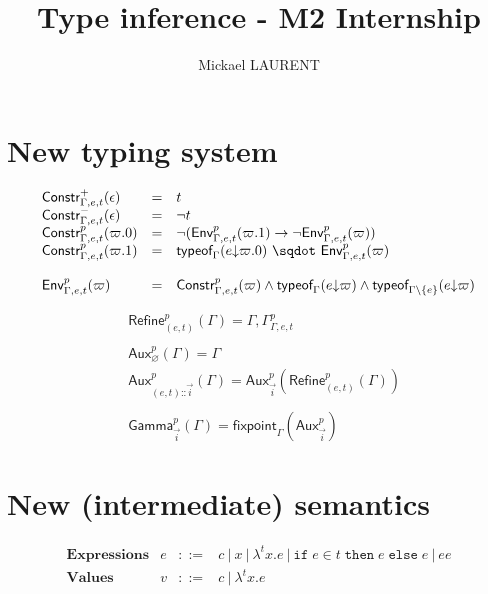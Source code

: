 \documentclass[a4paper]{article}%
\title{\vspace{1.5cm}Type inference - M2 Internship}
\author{Mickael LAURENT}
\date{\vspace{-5ex}}
\newcommand{\worra}[2]{#1\mathop{\,\sqdot\,} #2}
\newcommand{\alt}{~|~}
\newcommand{\ite}[4]{\ensuremath{\texttt{if}\;#1\in#2\;\texttt{then}\;#3\;\texttt{else}\;#4}}
\newcommand{\tyof}[2]{\textsf{typeof}_{#2}(#1)}
\newcommand{\typep}[3]{\textsf{Constr}^{#1}_{#3}(#2)}
\newcommand{\Gp}[2]{\textsf{Env}^{#1}_{#2}}
\newcommand{\arrow}[2]{#1\to #2}
\newcommand{\occ}[2]{#1{\downarrow}#2}
\newcommand{\Genv}[3]{\textsf{Gamma}^{#1}_{#2}(#3)}
\newcommand{\Gaux}[3]{\textsf{Aux}^{#1}_{#2}(#3)}
\newcommand{\Gaa}[2]{\textsf{Aux}^{#1}_{#2}}
\newcommand{\Refine}[3]{\textsf{Refine}^{#1}_{#2}(#3)}
\newcommand{\cons}[2]{{#1}\textsf{::}{#2}}
\newcommand{\fixpoint}{\textsf{fixpoint}}
\theoremstyle{definition}
\begin{document}
	\maketitle

    \section{New typing system}

    \[
    \begin{array}{lcl}
      \typep+\epsilon{\Gamma,e,t} & = & t\\
      \typep-\epsilon{\Gamma,e,t} & = & \neg t\\
      \typep{p}{\varpi.0}{\Gamma,e,t} & = & \neg(\arrow{\Gp p{\Gamma,e,t}{(\varpi.1)}}{\neg \Gp p {\Gamma,e,t} (\varpi)})\\
      \typep{p}{\varpi.1}{\Gamma,e,t} & = & \worra{\tyof{\occ e{\varpi.0}}\Gamma}{\Gp p {\Gamma,e,t} (\varpi)}\\ \\
      \Gp p {\Gamma,e,t} (\varpi) & = & \typep p \varpi {\Gamma,e,t} \land \tyof {\occ e \varpi} \Gamma
      \land \tyof {\occ e \varpi} {\Gamma\setminus\{e\}}\\
    \end{array}
    \]

    \begin{align*}
      &\Refine p {(e,t)} \Gamma = \Gamma,\Gamma^p_{\Gamma,e,t}\\&\\
      &\Gaux p {\varnothing} \Gamma = \Gamma\\
      &\Gaux p {\cons {(e,t)} {\vec i}} \Gamma = \Gaux p {\vec i} {\Refine p {(e,t)} \Gamma}\\&\\
      &\Genv p {\vec {i}} \Gamma=\fixpoint_\Gamma (\Gaa p {\vec {i}})
    \end{align*}

    \section{New (intermediate) semantics}

    \[
      \begin{array}{lrcl}
      \textbf{Expressions} & e & ::= & c\alt x \alt \lambda^tx.e \alt \ite e t e e \alt e e\\
      \textbf{Values} & v & ::= & c \alt \lambda^tx.e
      \end{array}
    \]
\end{document}
